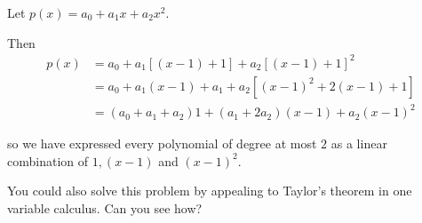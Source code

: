 \documentclass{ximera}
\begin{document}
\begin{free-response}
	Let $p(x)=a_0+a_1x+a_2x^2$. 
	
	Then \begin{align*}
		p(x) &= a_0+a_1[(x-1)+1]+a_2[(x-1)+1]^2\\
			   &= a_0+a_1(x-1)+a_1+a_2[(x-1)^2+2(x-1)+1]\\
			   &= (a_0+a_1+a_2)1+(a_1+2a_2)(x-1)+a_2(x-1)^2
		\end{align*}
	
	so we have expressed every polynomial of degree at most $2$ as a linear combination of $1,(x-1)$ and $(x-1)^2$.
	
	You could also solve this problem by appealing to Taylor's theorem in one variable calculus.  Can you see how?
\end{free-response}

 
\end{document}
